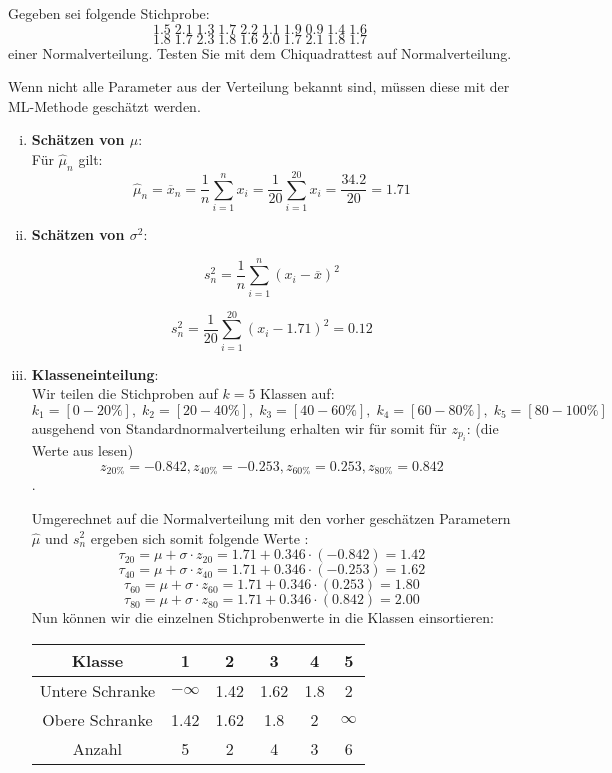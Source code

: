 \begin{uebsp}
\begin{Exercise}[label=ex:9.4]
Gegeben sei folgende Stichprobe:
\[1.5\;2.1\;1.3\;1.7\;2.2\;1.1\;1.9\;0.9\;1.4\;1.6\]
\[1.8\;1.7\;2.3\;1.8\;1.6\;2.0\;1.7\;2.1\;1.8\;1.7\]
einer Normalverteilung. Testen Sie mit dem Chiquadrattest auf Normalverteilung.
\end{Exercise}
\begin{Answer}
\begin{uebsp_theory}
Wenn nicht alle Parameter aus der Verteilung bekannt sind, müssen diese mit der ML-Methode geschätzt werden. 
\end{uebsp_theory}
\begin{enumerate}[i)]
\item \textbf{Schätzen von $\mu$}:\\
Für $\hat\mu_n$ gilt: \[\hat\mu_n=\overline x_n=\frac{1}{n}\sum_{i=1}^nx_i=\frac{1}{20}\sum_{i=1}^{20}x_i=\frac{34.2}{20}=1.71\]
\item \textbf{Schätzen von $\sigma^2$}:
\begin{uebsp_theory}
\[s_n^2= \frac{1}{n} \sum_{i=1}^n\left(x_i-\overline x\right)^2\]
\end{uebsp_theory}
\[s_n^2= \frac{1}{20} \sum_{i=1}^{20}(x_i-1.71)^2=0.12\]
\item \textbf{Klasseneinteilung}:\\
Wir teilen die Stichproben auf $k=5$ Klassen auf:
\[k_1=[0-20\%],\;k_2=[20-40\%],\;k_3=[40-60\%],\;k_4=[60-80\%],\;k_5=[80-100\%]\]
ausgehend von Standardnormalverteilung erhalten wir für somit für $z_{p_i}$: (die Werte aus  lesen)
\[z_{20\%}=-0.842,z_{40\%}=-0.253,z_{60\%}=0.253,z_{80\%}=0.842\].

Umgerechnet auf die Normalverteilung mit den vorher geschätzen Parametern $\hat\mu$ und $s_n^2$ ergeben sich somit folgende Werte :
\[\tau_{20}=\mu+\sigma\cdot z_{20}=1.71+0.346\cdot(-0.842)=1.42\]
\[\tau_{40}=\mu+\sigma\cdot z_{40}=1.71+0.346\cdot(-0.253)=1.62\]
\[\tau_{60}=\mu+\sigma\cdot z_{60}=1.71+0.346\cdot(0.253)=1.80\]
\[\tau_{80}=\mu+\sigma\cdot z_{80}=1.71+0.346\cdot(0.842)=2.00\]
Nun können wir die einzelnen Stichprobenwerte in die Klassen einsortieren:
\begin{center}
\begin{tabular}{|c|c|c|c|c|c|}
\hline
Klasse & 1 & 2 & 3 & 4 & 5\\
\hline
Untere Schranke & $-\infty$ &  1.42 & 1.62 & 1.8 & 2\\
\hline
Obere Schranke & 1.42 & 1.62 & 1.8 & 2 & $\infty$\\
\hline
Anzahl & 5 & 2 & 4 & 3 & 6\\
\hline
\end{tabular}
\end{center}


\end{enumerate}
\end{Answer}
\end{uebsp}
